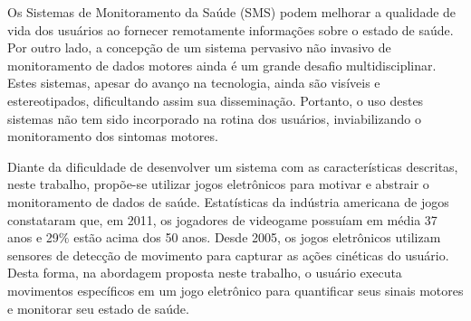 


Os Sistemas de Monitoramento da Saúde (SMS) podem melhorar a qualidade de vida dos usuários ao fornecer remotamente informações sobre o estado de saúde. Por outro lado, a concepção de um sistema pervasivo não invasivo de monitoramento de dados motores ainda é um grande desafio multidisciplinar. Estes sistemas, apesar do avanço na tecnologia, ainda são visíveis e estereotipados, dificultando assim sua disseminação. Portanto, o uso destes sistemas não tem sido incorporado na rotina dos usuários, inviabilizando o monitoramento dos sintomas motores.
 
Diante da dificuldade de desenvolver um sistema com as características descritas, neste trabalho, propõe-se utilizar jogos eletrônicos para motivar e abstrair o monitoramento de dados de saúde. Estatísticas da indústria americana de jogos constataram que, em 2011, os jogadores de videogame possuíam em média 37 anos e 29$\%$  estão acima dos 50 anos. Desde 2005, os jogos eletrônicos utilizam sensores de detecção de movimento para capturar as ações cinéticas do usuário. Desta forma, na abordagem proposta neste trabalho, o usuário executa movimentos específicos em um jogo eletrônico para quantificar seus sinais motores e monitorar seu estado de saúde.

